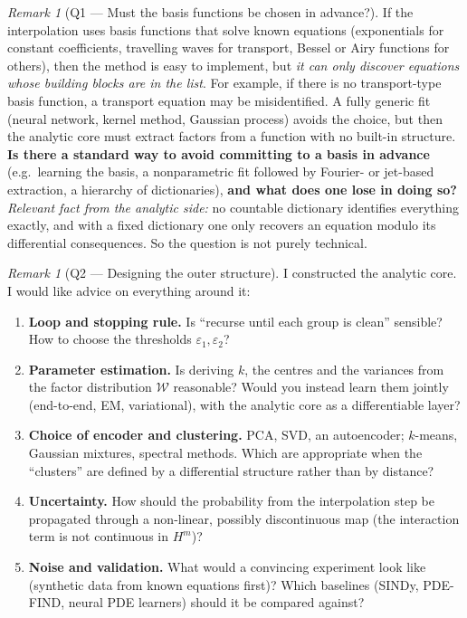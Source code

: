 \documentclass[11pt]{article}
\theoremstyle{plain}
\theoremstyle{definition}
\theoremstyle{remark}
\newtheorem{remark}[theorem]{Remark}
\newenvironment{askbox}[1]{\begin{remark}[#1]}{\end{remark}}
\begin{document}
\begin{askbox}{Q1 --- Must the basis functions be chosen in advance?}
If the interpolation uses basis functions that solve known equations (exponentials for constant coefficients, travelling waves for transport, Bessel or Airy functions for others), then the method is easy to implement, but \emph{it can only discover equations whose building blocks are in the list}. For example, if there is no transport-type basis function, a transport equation may be misidentified. A fully generic fit (neural network, kernel method, Gaussian process) avoids the choice, but then the analytic core must extract factors from a function with no built-in structure.\\[3pt]
\textbf{Is there a standard way to avoid committing to a basis in advance} (e.g.\ learning the basis, a nonparametric fit followed by Fourier- or jet-based extraction, a hierarchy of dictionaries), \textbf{and what does one lose in doing so?}\\[3pt]
\emph{Relevant fact from the analytic side:} no countable dictionary identifies everything exactly, and with a fixed dictionary one only recovers an equation modulo its differential consequences. So the question is not purely technical.
\end{askbox}

\begin{askbox}{Q2 --- Designing the outer structure}
I constructed the analytic core. I would like advice on everything around it:
\begin{enumerate}[nosep,leftmargin=*]
\item \textbf{Loop and stopping rule.} Is ``recurse until each group is clean'' sensible? How to choose the thresholds $\varepsilon_1,\varepsilon_2$?
\item \textbf{Parameter estimation.} Is deriving $k$, the centres and the variances from the factor distribution $\mathcal W$ reasonable? Would you instead learn them jointly (end-to-end, EM, variational), with the analytic core as a differentiable layer?
\item \textbf{Choice of encoder and clustering.} PCA, SVD, an autoencoder; $k$-means, Gaussian mixtures, spectral methods. Which are appropriate when the ``clusters'' are defined by a differential structure rather than by distance?
\item \textbf{Uncertainty.} How should the probability from the interpolation step be propagated through a non-linear, possibly discontinuous map (the interaction term is not continuous in $H^m$)?
\item \textbf{Noise and validation.} What would a convincing experiment look like (synthetic data from known equations first)? Which baselines (SINDy, PDE-FIND, neural PDE learners) should it be compared against?
\end{enumerate}
\end{askbox}
\end{document}
